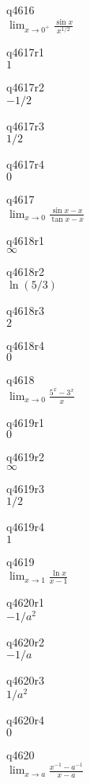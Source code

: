 q4616\\
\(\displaystyle \lim_{x \rightarrow 0^+} \frac{\sin x}{x^{1/2}} \)

q4617r1\\
\(\displaystyle 1 \)

q4617r2\\
\(\displaystyle -1/2 \)

q4617r3\\
\(\displaystyle 1/2 \)

q4617r4\\
\(\displaystyle 0 \)

q4617\\
\(\displaystyle \lim_{x \rightarrow 0} \frac{\sin x - x}{\tan x - x} \)

q4618r1\\
\(\displaystyle \infty \)

q4618r2\\
\(\displaystyle \ln(5/3) \)

q4618r3\\
\(\displaystyle 2 \)

q4618r4\\
\(\displaystyle 0 \)

q4618\\
\(\displaystyle \lim_{x \rightarrow 0} \frac{5^x - 3^x}{x} \)

q4619r1\\
\(\displaystyle 0 \)

q4619r2\\
\(\displaystyle \infty \)

q4619r3\\
\(\displaystyle 1/2 \)

q4619r4\\
\(\displaystyle 1 \)

q4619\\
\(\displaystyle \lim_{x \rightarrow 1} \frac{\ln x}{x-1} \)

q4620r1\\
\(\displaystyle -1/a^2 \)

q4620r2\\
\(\displaystyle -1/a \)

q4620r3\\
\(\displaystyle 1/a^2 \)

q4620r4\\
\(\displaystyle 0 \)

q4620\\
\(\displaystyle \lim_{x \rightarrow a} \frac{x^{-1} - a^{-1}}{x-a} \)

